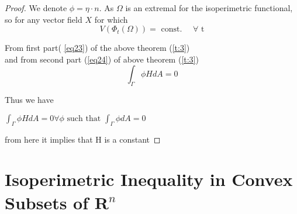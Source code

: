 \documentclass[oneside]{book}
\begin{document}
\begin{proof} 



We denote 
$\phi = \eta\cdot{n}$.
As $\Omega$ is an extremal for the isoperimetric functional, so for any vector field $X$ for which
\[
V\left(\Phi_{t}(\Omega)\right)=\text { const. } \quad \forall \text{ t}
\]

From first part( \ref{eq23}) of the above theorem (\ref{t:3}) \\ 

and from second part (\ref{eq24}) of above theorem (\ref{t:3})
$$\int_{\Gamma} \phi H d A=0$$

Thus we have \\

\begin{center}
   $ \int_{\Gamma} \phi H d A=0 \forall \phi \text { such that } \int_{\Gamma} \phi d A=0$ \\ 
\end{center}
from here it implies that H is a constant 
\end{proof}
\chapter{Isoperimetric Inequality in Convex Subsets of $\mathbf{R}^{n}$ }
  \label{chap:c4}


\end{document}
